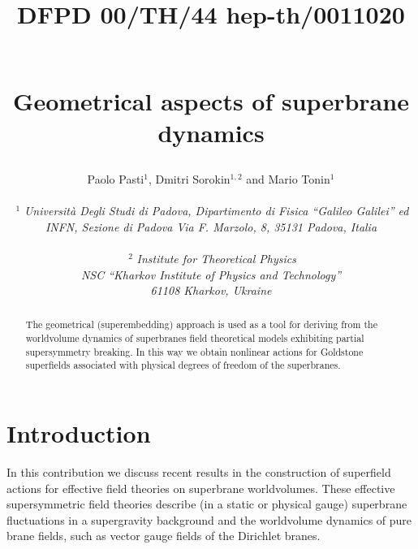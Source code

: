 \documentclass[a4paper,12pt]{article}
\begin{document}
\title{
\begin{flushright}
{{\small {DFPD 00/TH/44
\vskip-0.5cm
 hep-th/0011020}}}
\end{flushright}
~\\
{\bf Geometrical aspects of superbrane dynamics}
}

\bigskip
\author{Paolo Pasti$^{1}$, Dmitri Sorokin$^{1,2}$ and Mario
Tonin$^{1}$\\
~\\
{$~^1$ \it Universit\`a Degli Studi di Padova,
Dipartimento di Fisica ``Galileo Galilei'' ed}\\
{\it INFN, Sezione di Padova Via F. Marzolo, 8, 35131 Padova,
Italia}\\
~\\
{$~^2$ \it Institute for Theoretical Physics}\\
{\it NSC ``Kharkov Institute of Physics and Technology''}\\
{\it 61108 Kharkov, Ukraine} }
\date{}


\maketitle
\thispagestyle{empty}


\begin{abstract}
The geometrical (superembedding) approach is used as a tool for
deriving from the worldvolume dynamics of superbranes field
theoretical models exhibiting partial supersymmetry breaking. In
this way we obtain nonlinear actions for Goldstone superfields
associated with physical degrees of freedom of the superbranes.
\end{abstract}

\newpage
\section{Introduction}
In this contribution we discuss recent results in the construction
of superfield actions for effective field theories on superbrane
worldvolumes. These effective supersymmetric field theories
describe (in a static or physical gauge) superbrane fluctuations
in a supergravity background and the worldvolume dynamics of pure
brane fields, such as vector gauge fields of the Dirichlet branes.
\end{document}

